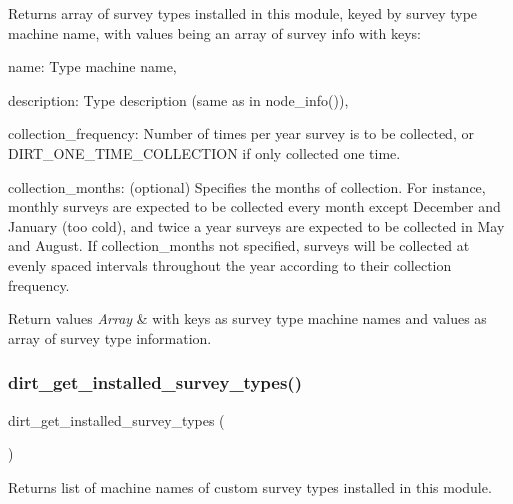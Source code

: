 Returns array of survey types installed in this module, keyed by survey type machine name, with values being an array of survey info with keys\+:
\begin{DoxyItemize}
\item name\+: Type machine name,
\item description\+: Type description (same as in node\+\_\+info()),
\item collection\+\_\+frequency\+: Number of times per year survey is to be collected, or D\+I\+R\+T\+\_\+\+O\+N\+E\+\_\+\+T\+I\+M\+E\+\_\+\+C\+O\+L\+L\+E\+C\+T\+I\+ON if only collected one time.
\item collection\+\_\+months\+: (optional) Specifies the months of collection. For instance, monthly surveys are expected to be collected every month except December and January (too cold), and twice a year surveys are expected to be collected in May and August. If collection\+\_\+months not specified, surveys will be collected at evenly spaced intervals throughout the year according to their collection frequency.
\end{DoxyItemize}


\begin{DoxyRetVals}{Return values}
{\em Array} & with keys as survey type machine names and values as array of survey type information. \\
\hline
\end{DoxyRetVals}
\mbox{\label{dirt_8table__schema_8inc_a9b7118c6199293f2aaf242a8af05d49e}} 
\subsubsection{\texorpdfstring{dirt\+\_\+get\+\_\+installed\+\_\+survey\+\_\+types()}{dirt\_get\_installed\_survey\_types()}}
{\footnotesize\ttfamily dirt\+\_\+get\+\_\+installed\+\_\+survey\+\_\+types (\begin{DoxyParamCaption}{ }\end{DoxyParamCaption})}

Returns list of machine names of custom survey types installed in this module.


